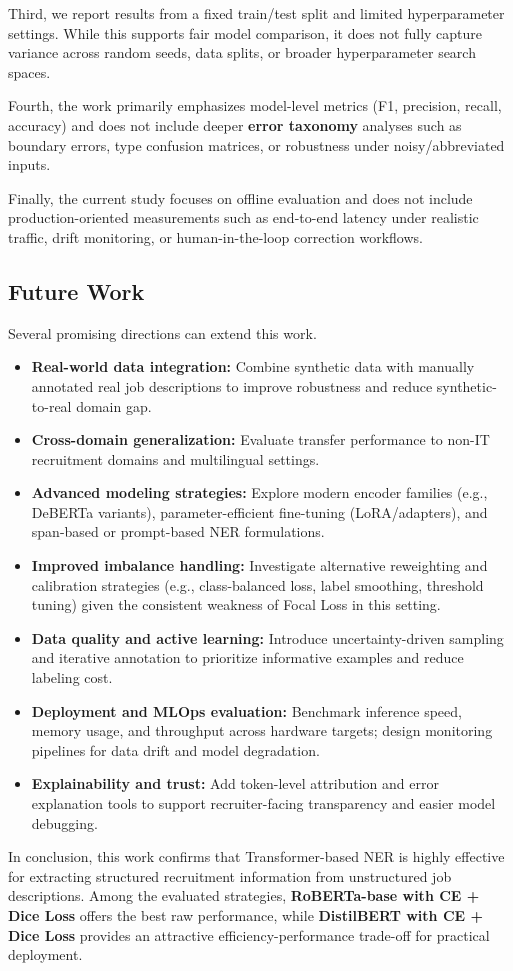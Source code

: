 Third, we report results from a fixed train/test split and limited hyperparameter settings. While this supports fair model comparison, it does not fully capture variance across random seeds, data splits, or broader hyperparameter search spaces.

Fourth, the work primarily emphasizes model-level metrics (F1, precision, recall, accuracy) and does not include deeper \textbf{error taxonomy} analyses such as boundary errors, type confusion matrices, or robustness under noisy/abbreviated inputs.

Finally, the current study focuses on offline evaluation and does not include production-oriented measurements such as end-to-end latency under realistic traffic, drift monitoring, or human-in-the-loop correction workflows.

\subsection{Future Work}
Several promising directions can extend this work.

\begin{itemize}
    \item \textbf{Real-world data integration:} Combine synthetic data with manually annotated real job descriptions to improve robustness and reduce synthetic-to-real domain gap.
    \item \textbf{Cross-domain generalization:} Evaluate transfer performance to non-IT recruitment domains and multilingual settings.
    \item \textbf{Advanced modeling strategies:} Explore modern encoder families (e.g., DeBERTa variants), parameter-efficient fine-tuning (LoRA/adapters), and span-based or prompt-based NER formulations.
    \item \textbf{Improved imbalance handling:} Investigate alternative reweighting and calibration strategies (e.g., class-balanced loss, label smoothing, threshold tuning) given the consistent weakness of Focal Loss in this setting.
    \item \textbf{Data quality and active learning:} Introduce uncertainty-driven sampling and iterative annotation to prioritize informative examples and reduce labeling cost.
    \item \textbf{Deployment and MLOps evaluation:} Benchmark inference speed, memory usage, and throughput across hardware targets; design monitoring pipelines for data drift and model degradation.
    \item \textbf{Explainability and trust:} Add token-level attribution and error explanation tools to support recruiter-facing transparency and easier model debugging.
\end{itemize}

In conclusion, this work confirms that Transformer-based NER is highly effective for extracting structured recruitment information from unstructured job descriptions. Among the evaluated strategies, \textbf{RoBERTa-base with CE + Dice Loss} offers the best raw performance, while \textbf{DistilBERT with CE + Dice Loss} provides an attractive efficiency-performance trade-off for practical deployment.